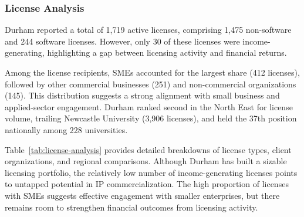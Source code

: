 \documentclass[journal,onecolumn, 10pt,draftclsnofoot]{IEEEtran}
\begin{document}
\subsubsection{License Analysis}

Durham reported a total of 1,719 active licenses, comprising 1,475 non-software and 244 software licenses. However, only 30 of these licenses were income-generating, highlighting a gap between licensing activity and financial returns.

Among the license recipients, SMEs accounted for the largest share (412 licenses), followed by other commercial businesses (251) and non-commercial organizations (145). This distribution suggests a strong alignment with small business and applied-sector engagement. Durham ranked second in the North East for license volume, trailing Newcastle University (3,906 licenses), and held the 37th position nationally among 228 universities.

Table~\ref{tab:license-analysis} provides detailed breakdowns of license types, client organizations, and regional comparisons. Although Durham has built a sizable licensing portfolio, the relatively low number of income-generating licenses points to untapped potential in IP commercialization. The high proportion of licenses with SMEs suggests effective engagement with smaller enterprises, but there remains room to strengthen financial outcomes from licensing activity.
\vspace{0.2cm}
\begin{table}[h]
\centering
\caption{IP License Analysis - Durham University}
\vspace{0.1cm}
\label{tab:license-analysis}
\end{table}
\end{document}
